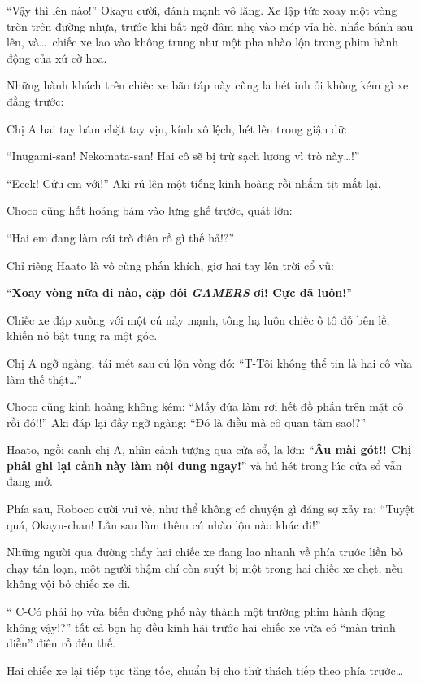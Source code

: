 \documentclass[../main.tex]{subfiles}
\begin{document}
``Vậy thì lên nào!'' Okayu cười, đánh mạnh vô lăng. Xe lập tức xoay một vòng tròn trên đường nhựa, trước khi bất ngờ đâm nhẹ vào mép vỉa hè, nhấc bánh sau lên, và\dots\ chiếc xe lao vào không trung như một pha nhào lộn trong phim hành động của xứ cờ hoa.

Những hành khách trên chiếc xe bão táp này cũng la hét inh ỏi không kém gì xe đằng trước:

Chị A hai tay bám chặt tay vịn, kính xô lệch, hét lên trong giận dữ:

``Inugami-san! Nekomata-san! Hai cô sẽ bị trừ sạch lương vì trò này\dots!''

``Eeek! Cứu em với!'' Aki rú lên một tiếng kinh hoàng rồi nhắm tịt mắt lại.

Choco cũng hốt hoảng bám vào lưng ghế trước, quát lớn:

``Hai em đang làm cái trò điên rồ gì thế hả!?''

Chỉ riêng Haato là vô cùng phấn khích, giơ hai tay lên trời cổ vũ:

``\textbf{Xoay vòng nữa đi nào, cặp đôi \textit{GAMERS} ơi! Cực đã luôn!}''

Chiếc xe đáp xuống với một cú nảy mạnh, tông hạ luôn chiếc ô tô đỗ bên lề, khiến nó bật tung ra một góc.

Chị A ngỡ ngàng, tái mét sau cú lộn vòng đó: ``T-Tôi không thể tin là hai cô vừa làm thế thật\dots''

Choco cũng kinh hoàng không kém: ``Mấy đứa làm rơi hết đồ phấn trên mặt cô rồi đó!!'' Aki đáp lại đầy ngỡ ngàng: ``Đó là điều mà cô quan tâm sao!?''

Haato, ngồi cạnh chị A, nhìn cảnh tượng qua cửa sổ, la lớn: ``\textbf{Âu mài gót!! Chị phải ghi lại cảnh này làm nội dung ngay!}'' và hú hét trong lúc cửa sổ vẫn đang mở.

Phía sau, Roboco cười vui vẻ, như thể không có chuyện gì đáng sợ xảy ra: ``Tuyệt quá, Okayu-chan! Lần sau làm thêm cú nhào lộn nào khác đi!''

Những người qua đường thấy hai chiếc xe đang lao nhanh về phía trước liền bỏ chạy tán loạn, một người thậm chí còn suýt bị một trong hai chiếc xe chẹt, nếu không vội bỏ chiếc xe đi.

``{\color{red} C-Có phải họ vừa biến đường phố này thành một trường phim hành động không vậy!?}'' tất cả bọn họ đều kinh hãi trước hai chiếc xe vừa có ``màn trình diễn'' điên rồ đến thế.

Hai chiếc xe lại tiếp tục tăng tốc, chuẩn bị cho thử thách tiếp theo phía trước\dots
\end{document}
